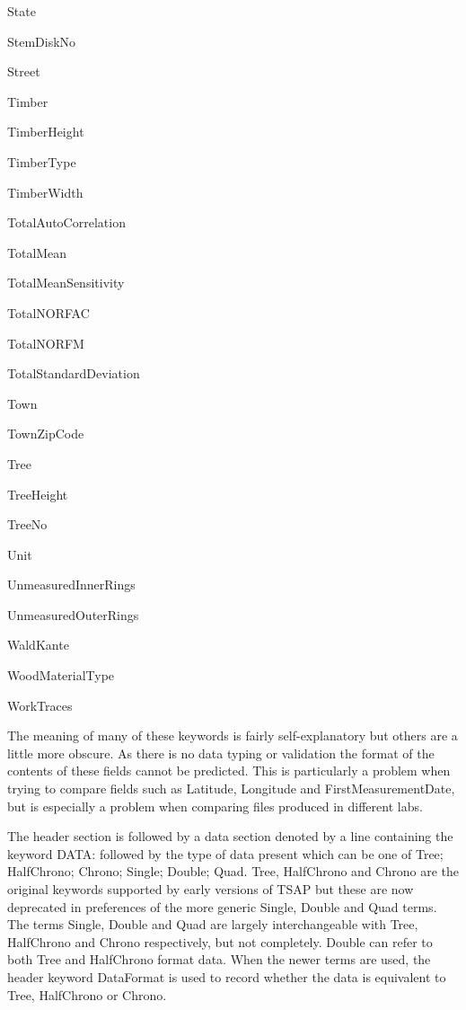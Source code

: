 \documentclass[10pt, headsepline,DIV14,BCOR0.5cm]{scrreprt}
\begin{document}
\begin{multicols}{2}
\begin{itemize*}
 \item  State
 \item  StemDiskNo
 \item  Street
 \item  Timber
 \item  TimberHeight
 \item  TimberType
 \item  TimberWidth
 \item  TotalAutoCorrelation
 \item  TotalMean
 \item  TotalMeanSensitivity
 \item  TotalNORFAC
 \item  TotalNORFM
 \item  TotalStandardDeviation
 \item  Town
 \item  TownZipCode
 \item  Tree
 \item  TreeHeight
 \item  TreeNo
 \item  Unit
 \item  UnmeasuredInnerRings
 \item  UnmeasuredOuterRings
 \item  WaldKante
 \item  WoodMaterialType
 \item  WorkTraces
\end{itemize*}
\end{multicols}

The meaning of many of these keywords is fairly self-explanatory but others are a little more obscure. As there is no data typing or validation the format of the contents of these fields cannot be predicted. This is particularly a problem when trying to compare fields such as Latitude, Longitude and FirstMeasurementDate, but is especially a problem when comparing files produced in different labs.

The header section is followed by a data section denoted by a line containing the keyword DATA: followed by the type of data present which can be one of Tree; HalfChrono; Chrono; Single; Double; Quad. Tree, HalfChrono and Chrono are the original keywords supported by early versions of TSAP but these are now deprecated in preferences of the more generic Single, Double and Quad terms. The terms Single, Double and Quad are largely interchangeable with Tree, HalfChrono and Chrono respectively, but not completely. Double can refer to both Tree and HalfChrono format data. When the newer terms are used, the header keyword DataFormat is used to record whether the data is equivalent to Tree, HalfChrono or Chrono.
\end{document}
